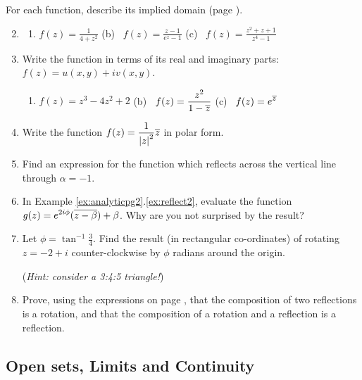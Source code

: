 \begin{exercises}
	\exstart For each function, describe its implied domain (page \pageref{sec:func}).
	\begin{enumerate}\setcounter{enumi}{1}
	  \item[]\begin{enumerate}
	    \item $\displaystyle f(z)=\frac 1{4+z^2}$\qquad
	    (b) \ $\displaystyle f(z)=\frac{z-1}{e^z-1}$\qquad
	    (c) \ $\displaystyle f(z)=\frac{z^2+z+1}{z^4-1}$
	  \end{enumerate}
	  
	  
	  \item Write the function in terms of its real and imaginary parts: $f(z)=u(x,y)+iv(x,y)$.
	  \begin{enumerate}
	  	\item $\displaystyle f(z)=z^3-4z^2+2$\qquad
	    (b) \ $\displaystyle f(z)=\frac{z^2}{1-\overline{z}}$\qquad
	    (c) \ $\displaystyle f(z)=e^{\overline{z}}$
	  \end{enumerate}
	  
	  
	  \item Write the function $\displaystyle f(z)=\frac 1{\left| z\right|^2}\overline{z}$ in polar form.
	  
	  
	  \item Find an expression for the function which reflects across the vertical line through $\alpha=-1$.
	  
	  
	  \item In Example \ref*{ex:analyticpg2}.\ref{ex:reflect2}, evaluate the function $\displaystyle g(z)=e^{2i\phi}(\overline{z-\beta})+\beta$. Why are you not surprised by the result?
	  
	  
	  \item Let $\phi=\tan^{-1}\frac 34$. Find the result (in rectangular co-ordinates) of rotating $z=-2+i$ counter-clockwise by $\phi$ radians around the origin.\par
	  (\emph{Hint: consider a 3:4:5 triangle!})
	  
	  
	  \item Prove, using the expressions on page \pageref{pg:2dgeom}, that the composition of two reflections is a rotation, and that the composition of a rotation and a reflection is a reflection.
	\end{enumerate}
\end{exercises}

\clearpage



\subsection{Open sets, Limits and Continuity}\label{sec:opensets}

